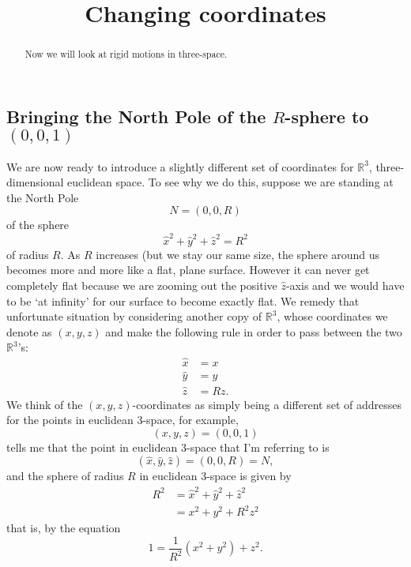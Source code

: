 \documentclass{ximera}
\title{Changing coordinates}
\begin{document}
\begin{abstract}
Now we will look at rigid motions in three-space.
\end{abstract}
\maketitle


\subsection*{Bringing the North Pole of the $R$-sphere to $\left(
0,0,1\right)  $}

We are now ready to introduce a slightly different set of coordinates for
$\mathbb{R}^{3}$, three-dimensional euclidean space. To see why we do this,
suppose we are standing at the North Pole%
\[
N=\left(  0,0,R\right)
\]
of the sphere%
\begin{equation}
\hat{x}^{2}+\hat{y}^{2}+\hat{z}^{2}=R^{2} \label{4}%
\end{equation}
of radius $R$. As $R$ increases (but we stay our same size, the sphere around
us becomes more and more like a flat, plane surface. However it can never get
completely flat because we are zooming out the positive $\hat{z}$-axis and we
would have to be `at infinity' for our surface to become exactly flat. We
remedy that unfortunate situation by considering another copy of
$\mathbb{R}^{3}$, whose coordinates we denote as $\left(  x,y,z\right)  $ and
make the following rule in order to pass between the two $\mathbb{R}^{3}$'s:%
\begin{align}
\hat{x}  &  =x\label{105}\\
\hat{y}  &  =y\nonumber\\
\hat{z}  &  =Rz.\nonumber
\end{align}
We think of the $\left(  x,y,z\right)  $-coordinates as simply being a
different set of addresses for the points in euclidean $3$-space, for example,%
\[
\left(  x,y,z\right)  =\left(  0,0,1\right)
\]
tells me that the point in euclidean $3$-space that I'm referring to is%
\[
\left(  \hat{x},\hat{y},\hat{z}\right)  =\left(  0,0,R\right)  =N,
\]
and the sphere of radius $R$ in euclidean $3$-space is given by%
\begin{align*}
R^{2}  &  =\hat{x}^{2}+\hat{y}^{2}+\hat{z}^{2}\\
&  =x^{2}+y^{2}+R^{2}z^{2}%
\end{align*}
that is, by the equation%
\begin{equation}
1=\frac{1}{R^{2}}\left(  x^{2}+y^{2}\right)  +z^{2}. \label{5}%
\end{equation}
\end{document}
